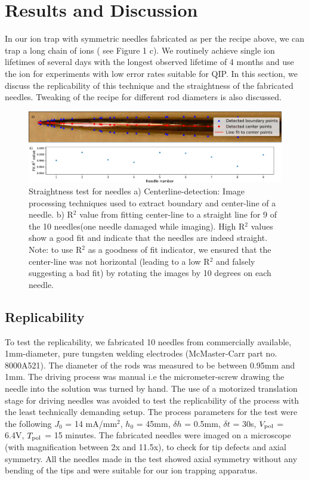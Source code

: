 \documentclass[%
 aip,
 amsmath,amssymb,
 reprint,%
]{revtex4-1}
\begin{document}
\section{\label{sec:level1 Results and Discussion}Results and Discussion}
In our ion trap with symmetric needles fabricated as per the recipe above, we can trap a long chain of ions ( see Figure 1 c).
We routinely achieve single ion lifetimes of several days with the longest observed lifetime of 4 months and use the ion for experiments with low error rates suitable for QIP\cite{Shih2021}.
In this section, we discuss the replicability of this technique and the straightness of the fabricated needles.
Tweaking of the recipe for different rod diameters is also discussed. 

\begin{figure}
    \centering
    \includegraphics[width =1.0\linewidth]{needle_straightness_test.pdf}
    \caption{Straightness test for needles a) Centerline-detection: Image processing techniques used to extract boundary and center-line of a needle. b) R$^2$ value from fitting center-line to a straight line for 9 of the 10 needles(one needle damaged while imaging). High R$^2$ values show a good fit and indicate that the needles are indeed straight. Note: to use R$^2$ as a goodness of fit indicator, we ensured that the center-line was not horizontal (leading to a low R$^2$ and falsely suggesting a bad fit) by rotating the images by 10 degrees on each needle.}
    \label{needle_straightness_test}
\end{figure}


\subsection{Replicability}
To test the replicability, we fabricated 10 needles from commercially available, 1mm-diameter, pure tungsten welding electrodes (McMaster-Carr part no. 8000A521). 
The diameter of the rods was measured to be between 0.95mm and 1mm. 
The driving process was manual i.e the micrometer-screw drawing the needle into the solution was turned by hand. 
The use of a motorized translation stage for driving needles was avoided to test the replicability of the process with the least technically demanding setup. 
The process parameters for the test were the following $J_0$ = 14 mA/mm$^2$, $h_0$ = 45mm, $\delta h$ = 0.5mm, $\delta t$ = 30s, $V_{\rm{pol}}$ = 6.4V, $T_{\rm{pol}}$ = 15 minutes.
The fabricated needles were imaged on a microscope (with magnification between 2x and 11.5x), to check for tip defects and axial symmetry. 
All the needles made in the test showed axial symmetry without any bending of the tips and were suitable for our ion trapping apparatus.
 
\end{document}
